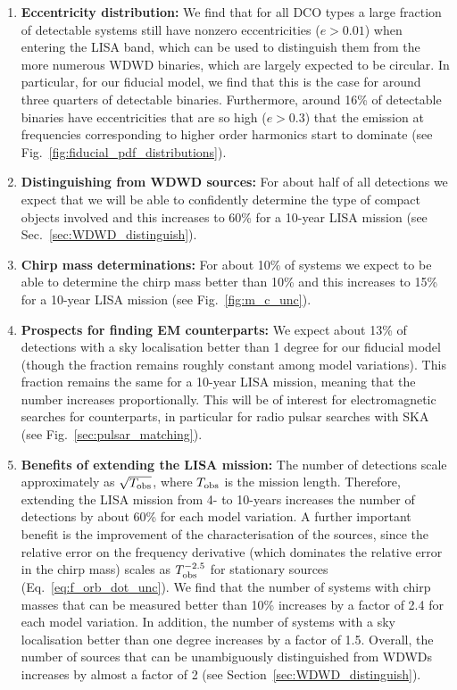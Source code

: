 \begin{enumerate}
    \item \textbf{Eccentricity distribution:} We find that for all DCO types a large fraction of detectable systems still have nonzero eccentricities ($e > 0.01$) when entering the LISA band, which can be used to distinguish them from the more numerous WDWD binaries, which are largely expected to be circular. In particular, for our fiducial model, we find that this is the case for around three quarters of detectable binaries. Furthermore, around 16\% of detectable binaries have eccentricities that are so high ($e > 0.3$) that the emission at frequencies corresponding to higher order harmonics start to dominate (see Fig.~\ref{fig:fiducial_pdf_distributions}).
    
    \item \textbf{Distinguishing from WDWD sources:} For about half of all detections we expect that we will be able to confidently determine the type of compact objects involved and this increases to 60\% for a 10-year LISA mission (see Sec.~\ref{sec:WDWD_distinguish}).
    
    \item \textbf{Chirp mass determinations:} For about 10\% of systems we expect to be able to determine the chirp mass better than 10\% and this increases to 15\% for a 10-year LISA mission (see Fig.~\ref{fig:m_c_unc}).

    \item \textbf{Prospects for finding EM counterparts:} We expect about 13\% of detections with a sky localisation better than 1 degree for our fiducial model (though the fraction remains roughly constant among model variations). This fraction remains the same for a 10-year LISA mission, meaning that the number increases proportionally. This will be of interest for electromagnetic searches for counterparts, in particular for radio pulsar searches with SKA (see Fig.~\ref{sec:pulsar_matching}).
 
   \item \textbf{Benefits of extending the LISA mission:} The number of detections scale approximately as $\sqrt{T_{\rm obs}}$, where $T_{\rm obs}$ is the mission length. Therefore, extending the LISA mission from 4- to 10-years increases the number of detections by about 60\% for each model variation. A further important benefit is the improvement of the characterisation of the sources, since the relative error on the frequency derivative (which dominates the relative error in the chirp mass) scales as $T_{\rm obs}^{-2.5}$ for stationary sources (Eq.~\ref{eq:f_orb_dot_unc}). We find that the number of systems with chirp masses that can be measured better than 10\% increases by a factor of 2.4 for each model variation.
   In addition, the number of systems with a sky localisation better than one degree increases by a factor of 1.5. Overall, the number of sources that can be unambiguously distinguished from WDWDs increases by almost a factor of 2 (see Section~\ref{sec:WDWD_distinguish}).
\end{enumerate}